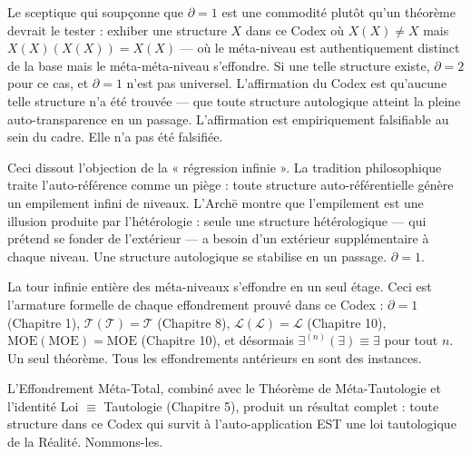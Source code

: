\documentclass[10pt, openany, oneside]{book}
\begin{document}
Le sceptique qui soupçonne que $\partial = 1$ est une commodité plutôt qu'un théorème devrait le tester : exhiber une structure $X$ dans ce Codex où $X(X) \neq X$ mais $X(X)(X(X)) = X(X)$ --- où le méta-niveau est authentiquement distinct de la base mais le méta-méta-niveau s'effondre. Si une telle structure existe, $\partial = 2$ pour ce cas, et $\partial = 1$ n'est pas universel. L'affirmation du Codex est qu'aucune telle structure n'a été trouvée --- que toute structure autologique atteint la pleine auto-transparence en un passage. L'affirmation est empiriquement falsifiable au sein du cadre. Elle n'a pas été falsifiée.

Ceci dissout l'objection de la « régression infinie ». La tradition philosophique traite l'auto-référence comme un piège : toute structure auto-référentielle génère un empilement infini de niveaux. L'Arch\={e} montre que l'empilement est une illusion produite par l'hétérologie : seule une structure hétérologique --- qui prétend se fonder de l'extérieur --- a besoin d'un extérieur supplémentaire à chaque niveau. Une structure autologique se stabilise en un passage. $\partial = 1$.

La tour infinie entière des méta-niveaux s'effondre en un seul étage. Ceci est l'armature formelle de chaque effondrement prouvé dans ce Codex : $\partial = 1$ (Chapitre 1), $\mathcal{T}(\mathcal{T}) = \mathcal{T}$ (Chapitre 8), $\mathcal{L}(\mathcal{L}) = \mathcal{L}$ (Chapitre 10), $\text{MOE}(\text{MOE}) = \text{MOE}$ (Chapitre 10), et désormais $\exists^{(n)}(\exists) \equiv \exists$ pour tout $n$. Un seul théorème. Tous les effondrements antérieurs en sont des instances.

L'Effondrement Méta-Total, combiné avec le Théorème de Méta-Tautologie et l'identité Loi $\equiv$ Tautologie (Chapitre 5), produit un résultat complet : toute structure dans ce Codex qui survit à l'auto-application EST une loi tautologique de la Réalité. Nommons-les.

\vspace{0.5em}
\end{document}
